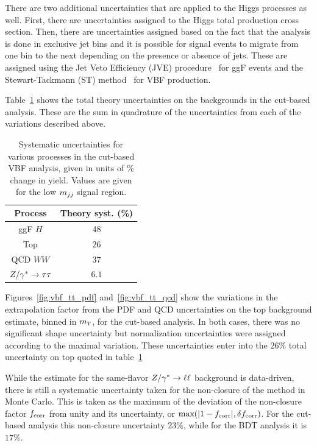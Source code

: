 There are two additional uncertainties that are applied to the Higgs processes as well. First, there are uncertainties assigned to the Higgs total production cross section. Then, there are uncertainties assigned based on the fact that the analysis is done in exclusive jet bins and it is possible for signal events to migrate from one bin to the next depending on the presence or absence of jets. These are assigned using the Jet Veto Efficiency (JVE) procedure~\cite{LHCXSWG,JVE} for ggF events and the Stewart-Tackmann (ST) method~\cite{ST} for VBF production. 


Table~\ref{tab:vbf_cb_theosys} shows the total theory uncertainties on the backgrounds in the cut-based analysis. These are the sum in quadrature of the uncertainties from each of the variations described above. 

\begin{table}[h!]
\centering
\captionsetup{justification=centering}
\begin{tabular}{|c|c|}
\hline
Process & Theory syst. (\%)  \\ \hline
ggF $H$ & $48$ \\ \hline
Top & $26$ \\ \hline
QCD $WW$ & $37$ \\ \hline
$Z/\gamma^{\ast} \to \tau\tau$ & $6.1$ \\ \hline
\end{tabular}
\caption{Systematic uncertainties for various processes in the cut-based VBF analysis, given in units of \% change in yield. Values are given for the low $m_{jj}$ signal region.}
\label{tab:vbf_cb_theosys}
\end{table}

Figures~\ref{fig:vbf_tt_pdf} and~\ref{fig:vbf_tt_qcd} show the variations in the extrapolation factor from the PDF and QCD uncertainties on the top background estimate, binned in $m_{\textrm{\footnotesize\sc t}}$, for the cut-based analysis. In both cases, there was no significant shape uncertainty but normalization uncertainties were assigned according to the maximal variation. These uncertainties enter into the $26\%$ total uncertainty on top quoted in table~\ref{tab:vbf_cb_theosys}

While the estimate for the same-flavor $Z/\gamma^{\ast}\to\ell\ell$ background is data-driven, there is still a systematic uncertainty taken for the non-closure of the method in Monte Carlo. This is taken as the maximum of the deviation of the non-closure factor $f_{\rm corr}$ from unity and its uncertainty, or $\textrm{max}(|1 - f_{\rm corr}|, \delta f_{\rm corr})$. For the cut-based analysis this non-closure uncertainty $23$\%, while for the BDT analysis it is $17\%$.

